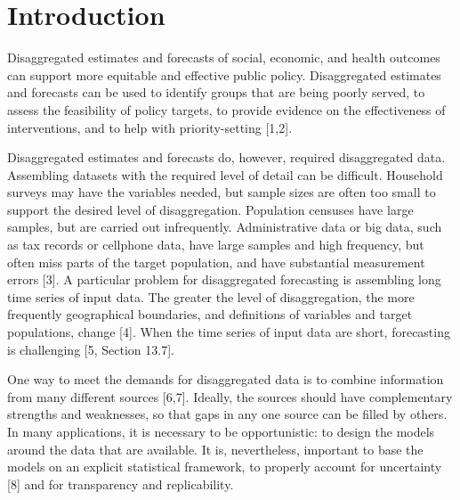 \documentclass[10pt,letterpaper]{article}
\begin{document}

\linenumbers

\newpage

\hypertarget{introduction}{%
\section{Introduction}\label{introduction}}

Disaggregated estimates and forecasts of social, economic, and health
outcomes can support more equitable and effective public policy.
Disaggregated estimates and forecasts can be used to identify groups
that are being poorly served, to assess the feasibility of policy
targets, to provide evidence on the effectiveness of interventions, and
to help with priority-setting {[}1,2{]}.

Disaggregated estimates and forecasts do, however, required
disaggregated data. Assembling datasets with the required level of
detail can be difficult. Household surveys may have the variables
needed, but sample sizes are often too small to support the desired
level of disaggregation. Population censuses have large samples, but are
carried out infrequently. Administrative data or big data, such as tax
records or cellphone data, have large samples and high frequency, but
often miss parts of the target population, and have substantial
measurement errors {[}3{]}. A particular problem for disaggregated
forecasting is assembling long time series of input data. The greater
the level of disaggregation, the more frequently geographical
boundaries, and definitions of variables and target populations, change
{[}4{]}. When the time series of input data are short, forecasting is
challenging {[}5, Section 13.7{]}.

One way to meet the demands for disaggregated data is to combine
information from many different sources {[}6,7{]}. Ideally, the sources
should have complementary strengths and weaknesses, so that gaps in any
one source can be filled by others. In many applications, it is
necessary to be opportunistic: to design the models around the data that
are available. It is, nevertheless, important to base the models on an
explicit statistical framework, to properly account for uncertainty
{[}8{]} and for transparency and replicability.
\end{document}
